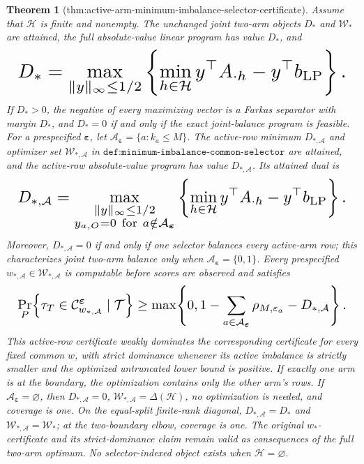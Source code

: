 \documentclass{article}
\newtheorem{theorem}{Theorem}
\begin{document}
\begin{theorem}[thm:active-arm-minimum-imbalance-selector-certificate]\label{thm:active-arm-minimum-imbalance-selector-certificate}
Assume that \(\mathcal H\) is finite and nonempty. The unchanged joint two-arm objects \(D_*\) and \(\mathcal W_*\) are attained, the full absolute-value linear program has value \(D_*\), and
\[
\makebox[\linewidth][c]{\resizebox{0.98\linewidth}{!}{\(\displaystyle D_*=\max_{\lVert y\rVert_\infty\le1/2}
\left\{\min_{h\in\mathcal H}y^\top A_{\cdot h}-y^\top b_{\mathrm{LP}}\right\}.\)}}
\]
If \(D_*>0\), the negative of every maximizing vector is a Farkas separator with margin \(D_*\), and \(D_*=0\) if and only if the exact joint-balance program is feasible. For a prespecified \(\boldsymbol\varepsilon\), let \(\mathcal A_{\boldsymbol\varepsilon}=\{a:k_a\le M\}\). The active-row minimum \(D_{*,\mathcal A}\) and optimizer set \(\mathcal W_{*,\mathcal A}\) in \(\texttt{def:minimum-imbalance-common-selector}\) are attained, and the active-row absolute-value program has value \(D_{*,\mathcal A}\). Its attained dual is
\[
\makebox[\linewidth][c]{\resizebox{0.98\linewidth}{!}{\(\displaystyle D_{*,\mathcal A}=\max_{\substack{\lVert y\rVert_\infty\le1/2\\y_{a,O}=0\ \mathrm{for}\ a\notin\mathcal A_{\boldsymbol\varepsilon}}}
\left\{\min_{h\in\mathcal H}y^\top A_{\cdot h}-y^\top b_{\mathrm{LP}}\right\}.\)}}
\]
Moreover, \(D_{*,\mathcal A}=0\) if and only if one selector balances every active-arm row; this characterizes joint two-arm balance only when \(\mathcal A_{\boldsymbol\varepsilon}=\{0,1\}\). Every prespecified \(w_{*,\mathcal A}\in\mathcal W_{*,\mathcal A}\) is computable before scores are observed and satisfies
\[
\makebox[\linewidth][c]{\resizebox{0.98\linewidth}{!}{\(\displaystyle \Pr_P\!\left\{\tau_T\in\mathcal C^{\boldsymbol\varepsilon}_{w_{*,\mathcal A}}\mid\mathcal T\right\}
\ge\max\!\left\{0,1-\sum_{a\in\mathcal A_{\boldsymbol\varepsilon}}\rho_{M,\varepsilon_a}-D_{*,\mathcal A}\right\}.\)}}
\]
This active-row certificate weakly dominates the corresponding certificate for every fixed common \(w\), with strict dominance whenever its active imbalance is strictly smaller and the optimized untruncated lower bound is positive. If exactly one arm is at the boundary, the optimization contains only the other arm's rows. If \(\mathcal A_{\boldsymbol\varepsilon}=\varnothing\), then \(D_{*,\mathcal A}=0\), \(\mathcal W_{*,\mathcal A}=\Delta(\mathcal H)\), no optimization is needed, and coverage is one. On the equal-split finite-rank diagonal, \(D_{*,\mathcal A}=D_*\) and \(\mathcal W_{*,\mathcal A}=\mathcal W_*\); at the two-boundary elbow, coverage is one. The original \(w_*\)-certificate and its strict-dominance claim remain valid as consequences of the full two-arm optimum. No selector-indexed object exists when \(\mathcal H=\varnothing\).
\end{theorem}
\end{document}
